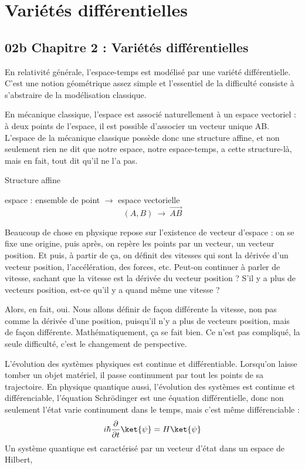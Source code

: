 \chapter{Variétés différentielles}
\section{02b Chapitre 2 : Variétés différentielles}

En relativité générale, l'espace-temps est modélisé par une variété
différentielle. C'est une notion géométrique assez simple et l'essentiel de la
difficulté consiste à s'abstraire de la modélisation classique.

En mécanique classique, l'espace est associé naturellement à un espace
vectoriel : à deux points de l'espace, il est possible d'associer un
vecteur unique AB. L'espace de la mécanique classique possède donc une
structure affine, et non seulement rien ne dit que notre espace, notre
espace-temps, a cette structure-là, mais en fait, tout dit qu'il ne l'a pas.

Structure affine

espace : ensemble de point \qquad $\to$ espace vectorielle
\[
(A,B)\ \to\ \vec{AB}
\]

Beaucoup de chose en physique repose sur l'existence de vecteur d'espace : on
se fixe une origine, puis après, on repère les points par un vecteur, un
vecteur position. Et puis, à partir de ça, on définit des vitesses qui sont la
dérivée d'un vecteur position, l'accélération, des forces, etc. Peut-on
continuer à parler de vitesse, sachant que la vitesse est la dérivée du vecteur
position ? S'il y a plus de vecteurs position, est-ce qu'il y a quand même une
vitesse ?

Alors, en fait, oui. Nous allons définir de façon différente la vitesse, non
pas comme la dérivée d'une position, puisqu'il n'y a plus de vecteurs position,
mais de façon différente. Mathématiquement, ça se fait bien. Ce n'est pas
compliqué, la seule difficulté, c'est le changement de perspective.

L'évolution des systèmes physiques est continue et différentiable. Lorsqu'on
laisse tomber un objet matériel, il passe continument par tout les points de sa
trajectoire.
En physique quantique aussi, l'évolution des systèmes est continue
et différenciable, l'équation Schrödinger est une équation différentielle, donc
non seulement l'état varie continument dans le temps, mais c'est même
différenciable :
\[
i\hbar\frac{\partial}{\partial t}\ket{\psi} = H\ket{\psi}
\]
Un système quantique est caractérisé par un vecteur d'état dans un espace de
Hilbert, 

